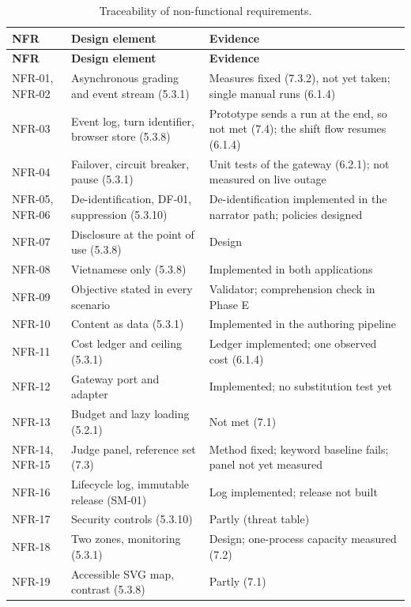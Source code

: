{\small{}\renewcommand{\arraystretch}{1.1}
\begin{longtable}{|>{\raggedright\arraybackslash}p{}|>{\raggedright\arraybackslash}p{}|>{\raggedright\arraybackslash}p{}|}
\caption{Traceability of non-\allowbreak{}functional requirements.} \\
\hline
\textbf{NFR} & \textbf{Design element} & \textbf{Evidence} \\ \hline
\endfirsthead
\hline
\textbf{NFR} & \textbf{Design element} & \textbf{Evidence} \\ \hline
\endhead
NFR-01, NFR-02 & Asynchronous grading and event stream (5.3.1) & Measures fixed (7.3.2), not yet taken; single manual runs (6.1.4) \\ \hline
NFR-03 & Event log, turn identifier, browser store (5.3.8) & Prototype sends a run at the end, so not met (7.4); the shift flow resumes (6.1.4) \\ \hline
NFR-04 & Failover, circuit breaker, pause (5.3.1) & Unit tests of the gateway (6.2.1); not measured on live outage \\ \hline
NFR-05, NFR-06 & De-\allowbreak{}identification, DF-01, suppression (5.3.10) & De-\allowbreak{}identification implemented in the narrator path; policies designed \\ \hline
NFR-07 & Disclosure at the point of use (5.3.8) & Design \\ \hline
NFR-08 & Vietnamese only (5.3.8) & Implemented in both applications \\ \hline
NFR-09 & Objective stated in every scenario & Validator; comprehension check in Phase E \\ \hline
NFR-10 & Content as data (5.3.1) & Implemented in the authoring pipeline \\ \hline
NFR-11 & Cost ledger and ceiling (5.3.1) & Ledger implemented; one observed cost (6.1.4) \\ \hline
NFR-12 & Gateway port and adapter & Implemented; no substitution test yet \\ \hline
NFR-13 & Budget and lazy loading (5.2.1) & Not met (7.1) \\ \hline
NFR-14, NFR-15 & Judge panel, reference set (7.3) & Method fixed; keyword baseline fails; panel not yet measured \\ \hline
NFR-16 & Lifecycle log, immutable release (SM-01) & Log implemented; release not built \\ \hline
NFR-17 & Security controls (5.3.10) & Partly (threat table) \\ \hline
NFR-18 & Two zones, monitoring (5.3.1) & Design; one-process capacity measured (7.2) \\ \hline
NFR-19 & Accessible SVG map, contrast (5.3.8) & Partly (7.1) \\ \hline
\end{longtable}
}
